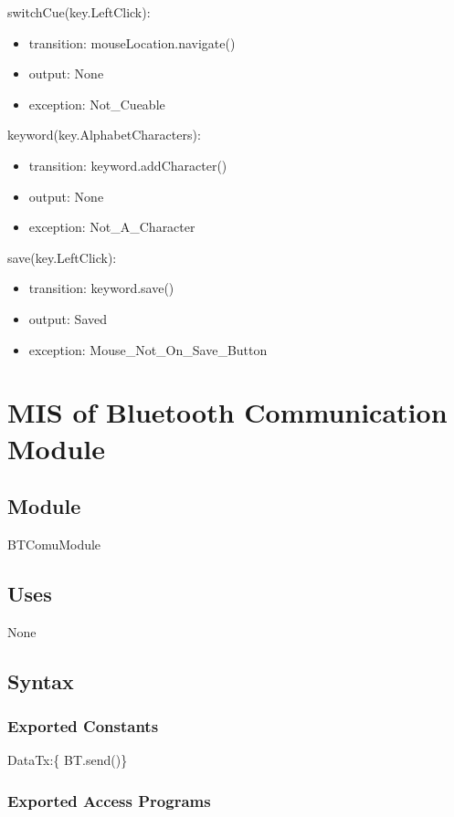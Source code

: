 \documentclass[12pt, titlepage]{article}
\begin{document}
\noindent switchCue(key.LeftClick):
\begin{itemize}
\item transition: mouseLocation.navigate() 
\item output: None
\item exception: Not\_Cueable 
\end{itemize}

\noindent keyword(key.AlphabetCharacters):
\begin{itemize}
\item transition: keyword.addCharacter()
\item output: None
\item exception: Not\_A\_Character 
\end{itemize}

\noindent save(key.LeftClick):
\begin{itemize}
\item transition: keyword.save() 
\item output: Saved
\item exception: Mouse\_Not\_On\_Save\_Button 
\end{itemize}

\newpage

\section{MIS of Bluetooth Communication Module} \label{BTComuModule} 


\subsection{Module}

BTComuModule

\subsection{Uses}

None

\subsection{Syntax}

\subsubsection{Exported Constants}
DataTx:\{ BT.send()\}

\subsubsection{Exported Access Programs}
\end{document}
